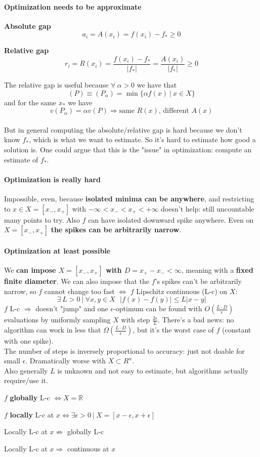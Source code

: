 \documentclass[10pt]{report}
\begin{document}
\paragraph{Optimization needs to be approximate} \begin{list}{}{}
	\item \textbf{Absolute gap} $$a_i = A(x_i) = f(x_i) - f_* \geq 0$$
	\item \textbf{Relative gap} $$r_i = R(x_i) = \frac{f(x_i) - f_*}{|f_*|} = \frac{A(x_i)}{|f_*|}\geq 0$$
\end{list}
The relative gap is useful because $\forall\:\alpha>0$ we have that $$(P)\equiv (P_\alpha) = \min\{\alpha f(x)\:|\:x\in X\}$$ and for the same $x_*$ we have $$v(P_\alpha) = \alpha v(P) \Rightarrow\text{same }R(x)\text{, different }A(x)$$\\
But in general computing the absolute/relative gap is hard because we don't know $f_*$, which is what we want to estimate. So it's hard to estimate how good a solution is. One could argue that this is the "issue" in optimization: compute an estimate of $f_*$.
\paragraph{Optimization is really hard} Impossible, even, because \textbf{isolated minima can be anywhere}, and restricting to $x\in X=[x_-, x_+]$ with $-\infty<x_-<x_+<+\infty$ doesn't help: still uncountable many points to try. Also $f$ can have isolated downward spike anywhere. Even on $X = [x_-, x_+]$ \textbf{the spikes can be arbitrarily narrow}.
\paragraph{Optimization at least possible} We \textbf{can impose $X=[x_-,x_+]$ with $D = x_+-x_-<\infty$}, meaning with a \textbf{fixed finite diameter}. We can also impose that the $f$'s spikes can't be arbitrarily narrow, so $f$ cannot change too fast $\Leftrightarrow$ $f$ Lipschitz continuous (L-c) on $X$: $$\exists\: L > 0\:|\:\forall x,y\in X\:\:\:|f(x) - f(y)| \leq L|x - y|$$
$f$ L-c $\Rightarrow$ doesn't "jump" and one $\epsilon$-optimum can be found with $O(\frac{L\cdot D}{\epsilon})$ evaluations by uniformly sampling $X$ with step $\frac{2\epsilon}{L}$. There's a bad news: no algorithm can work in less that $\Omega(\frac{L\cdot D}{\epsilon})$, but it's the worst case of $f$ (constant with one spike).\\
The number of steps is inversely proportional to accuracy: just not doable for small $\epsilon$. Dramatically worse with $X\subset R^n$.\\
Also generally $L$ is unknown and not easy to estimate, but algorithms actually require/use it.
\begin{list}{}{}
	\item $f$ \textbf{globally} L-c $\Leftrightarrow X=\mathbb{R}$
	\item $f$ \textbf{locally} L-c at $x \Leftrightarrow \exists\epsilon >0\:|\:X=[x-\epsilon,x+\epsilon]$
	\item Locally L-c at $x \not\Rightarrow$ globally L-c
	\item Locally L-c at $x \Rightarrow$ continuous at $x$
\end{list}
\end{document}
